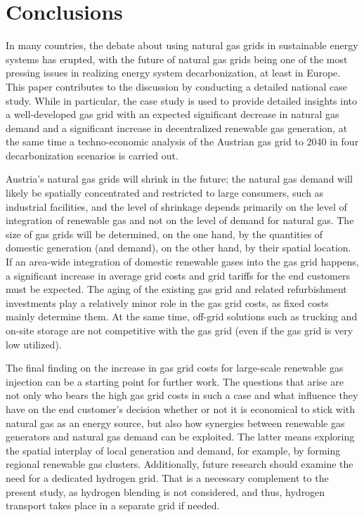 \section{Conclusions}\label{conclusions}
In many countries, the debate about using natural gas grids in sustainable energy systems has erupted, with the future of natural gas grids being one of the most pressing issues in realizing energy system decarbonization, at least in Europe. This paper contributes to the discussion by conducting a detailed national case study. While in particular, the case study is used to provide detailed insights into a well-developed gas grid with an expected significant decrease in natural gas demand and a significant increase in decentralized renewable gas generation, at the same time a techno-economic analysis of the Austrian gas grid to 2040 in four decarbonization scenarios is carried out.\vspace{0.3cm}

Austria's natural gas grids will shrink in the future; the natural gas demand will likely be spatially concentrated and restricted to large consumers, such as industrial facilities, and the level of shrinkage depends primarily on the level of integration of renewable gas and not on the level of demand for natural gas. The size of gas grids will be determined, on the one hand, by the quantities of domestic generation (and demand), on the other hand, by their spatial location. If an area-wide integration of domestic renewable gases into the gas grid happens, a significant increase in average grid costs and grid tariffs for the end customers must be expected. The aging of the existing gas grid and related refurbishment investments play a relatively minor role in the gas grid costs, as fixed costs mainly determine them. At the same time, off-grid solutions such as trucking and on-site storage are not competitive with the gas grid (even if the gas grid is very low utilized).\vspace{0.3cm}

The final finding on the increase in gas grid costs for large-scale renewable gas injection can be a starting point for further work. The questions that arise are not only who bears the high gas grid costs in such a case and what influence they have on the end customer's decision whether or not it is economical to stick with natural gas as an energy source, but also how synergies between renewable gas generators and natural gas demand can be exploited. The latter means exploring the spatial interplay of local generation and demand, for example, by forming regional renewable gas clusters. Additionally, future research should examine the need for a dedicated hydrogen grid. That is a necessary complement to the present study, as hydrogen blending is not considered, and thus, hydrogen transport takes place in a separate grid if needed.\vspace{0.3cm}
















